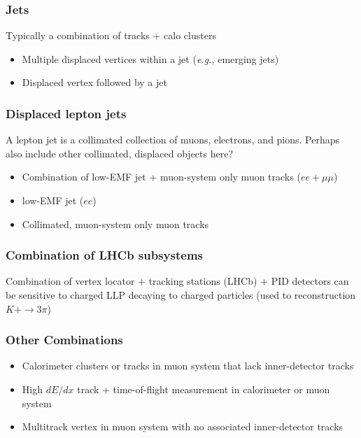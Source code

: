 \subsubsection{Jets}

Typically a combination of tracks + calo clusters

\begin{itemize}
\item Multiple displaced vertices within a jet (\emph{e.g.,} emerging jets)
\item Displaced vertex followed by a jet
\end{itemize}

\subsubsection{Displaced lepton jets}

A lepton jet is a collimated collection of muons, electrons, and pions. Perhaps also include other collimated, displaced objects here?

\begin{itemize}
\item Combination of low-EMF jet + muon-system only muon tracks ($ee+\mu\mu$)
\item low-EMF jet ($ee$)
\item Collimated, muon-system only muon tracks
\end{itemize}

\subsubsection{Combination of LHCb subsystems}

Combination of vertex locator + tracking stations (LHCb) + PID detectors can be sensitive to charged LLP decaying to charged particles (used to reconstruction $K+\rightarrow 3\pi$)

\subsubsection{Other Combinations}

\begin{itemize}
\item Calorimeter clusters or tracks in muon system that lack inner-detector tracks
\item High $dE/dx$ track + time-of-flight measurement in calorimeter or muon system
\item Multitrack vertex in muon system with no associated inner-detector tracks 
\end{itemize}

